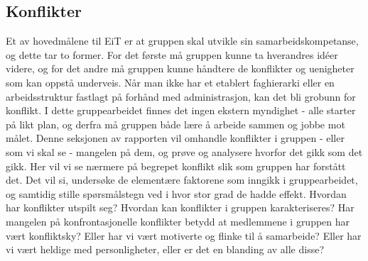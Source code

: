 \subsection{Konflikter}

Et av hovedmålene til EiT er at gruppen skal utvikle sin samarbeidskompetanse\cite{eitlaeringsmaal}, og dette tar to former.
For det første må gruppen kunne ta hverandres id\'{e}er videre, og for det andre må gruppen kunne håndtere de konflikter og uenigheter som kan oppstå underveis.
Når man ikke har et etablert faghierarki eller en arbeidsstruktur fastlagt på forhånd med administrasjon, kan det bli grobunn for konflikt. 
I dette gruppearbeidet finnes det ingen ekstern myndighet - alle starter på likt plan, og derfra må gruppen både lære å arbeide sammen og jobbe mot målet. 
Denne seksjonen av rapporten vil omhandle konflikter i gruppen - eller som vi skal se - mangelen på dem, og prøve og analysere hvorfor det gikk som det gikk.
Her vil vi se nærmere på begrepet konflikt slik som gruppen har forstått det.
Det vil si, undersøke de elementære faktorene som inngikk i gruppearbeidet, og samtidig stille spørsmålstegn ved i hvor stor grad de hadde effekt.
Hvordan har konflikter utspilt seg?
Hvordan kan konflikter i gruppen karakteriseres? 
Har mangelen på konfrontasjonelle konflikter betydd at medlemmene i gruppen har vært konfliktsky? Eller har vi vært motiverte og flinke til å samarbeide? Eller har vi vært heldige med personligheter, eller er det en blanding av alle disse?
\\